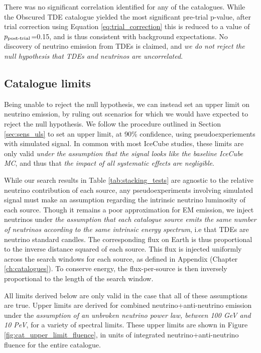 There was no significant correlation identified for any of the catalogues. While the Obscured TDE catalogue yielded the most significant pre-trial p-value, after trial correction using Equation \ref{eq:trial_correction} this is reduced to a value of $p_{\textup{post-trial}}$=0.15, and is thus consistent with background expectations. No discovery of neutrino emission from TDEs is claimed, and \emph{we do not reject the null hypothesis that TDEs and neutrinos are uncorrelated}.

\subsection*{Catalogue limits}

Being unable to reject the null hypothesis, we can instead set an upper limit on neutrino emission, by ruling out scenarios for which we would have expected to reject the null hypothesis. We follow the procedure outlined in Section \ref{sec:sens_uls} to set an upper limit, at 90\% confidence, using pseudoexperiements with simulated signal. In common with most IceCube studies, these limits are only valid \emph{under the assumption that the signal looks like the baseline IceCube MC}, and thus that \emph{the impact of all systematic effects are negligible}.

While our search results in Table \ref{tab:stacking_tests} are agnostic to the relative neutrino contribution of each source, any pseudoexperiments involving simulated signal must make an assumption regarding the intrinsic neutrino luminosity of each source. Though it remains a poor approximation for EM emission, we inject neutrinos under \emph{the assumption that each catalogue source emits the same number of neutrinos according to the same intrinsic energy spectrum}, i.e that TDEs are neutrino standard candles. The corresponding flux on Earth is thus proportional to the inverse distance squared of each source. This flux is injected uniformly across the search windows for each source, as defined in Appendix (Chapter \ref{ch:catalogues}). To conserve energy, the flux-per-source is then inversely proportional to the length of the search window. 

All limits derived below are only valid in the case that all of these assumptions are true. Upper limits are derived for combined neutrino+anti-neutrino emission under the \emph{assumption of an unbroken neutrino power law, between 100 GeV and 10 PeV}, for a variety of spectral limits. These upper limits are shown in Figure \ref{fig:cat_upper_limit_fluence}, in units of integrated neutrino+anti-neutrino fluence for the entire catalogue. 

